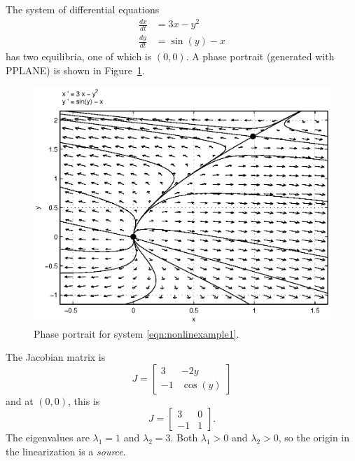 \begin{xexample}
The system of differential equations
\begin{equation}
\begin{split}
   \frac{dx}{dt} & = 3x-y^2 \\
   \frac{dy}{dt} & = \sin(y)-x
\end{split}
\label{eqn:nonlinexample1}
\end{equation}
has two equilibria, one of which is  $(0,0)$.
A phase portrait (generated with PPLANE) is shown in
Figure~\ref{fig:nonlinexample1}.
\begin{figure}
\centerline{%
\includegraphics[width=5in]{pplane_plots/NonlinExample1.ps}
}
\caption{Phase portrait for system \eqref{eqn:nonlinexample1}.}
\label{fig:nonlinexample1}
\end{figure}
  The Jacobian matrix is
\begin{equation}
  J = \begin{bmatrix}
           3 &  -2y \\
	   -1 & \cos(y)
      \end{bmatrix}
\end{equation}
and at $(0,0)$, this is
\begin{equation}
  J = \begin{bmatrix}
           3 &  0 \\
	   -1 & 1
      \end{bmatrix}.
\end{equation}
The eigenvalues are $\lambda_1=1$ and $\lambda_2=3$.
Both $\lambda_1>0$ and $\lambda_2>0$, so the origin
in the linearization is a \emph{source}.

\end{xexample}

